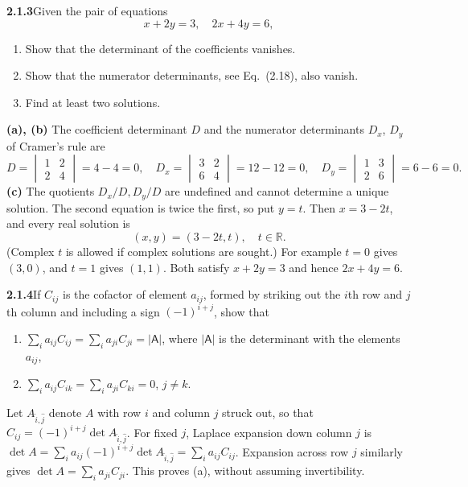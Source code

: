 \par\bigskip
\noindent\textbf{2.1.3}\quad Given the pair of equations
\[
x+2y=3,\quad 2x+4y=6,
\]
\begin{enumerate}
\item[(a)] Show that the determinant of the coefficients vanishes.
\item[(b)] Show that the numerator determinants, see Eq.~(2.18), also vanish.
\item[(c)] Find at least two solutions.
\end{enumerate}
\solution
\textbf{(a), (b)} The coefficient determinant $D$ and the numerator
determinants $D_x$, $D_y$ of Cramer's rule are
\[
D=\begin{vmatrix}1&2\\2&4\end{vmatrix}=4-4=0,\quad
D_x=\begin{vmatrix}3&2\\6&4\end{vmatrix}=12-12=0,\quad
D_y=\begin{vmatrix}1&3\\2&6\end{vmatrix}=6-6=0.
\]
\textbf{(c)} The quotients $D_x/D,D_y/D$ are undefined and cannot
determine a unique solution. The second equation is twice the first,
so put $y=t$. Then $x=3-2t$, and every real solution is
\[
\boxed{(x,y)=(3-2t,t),\quad t\in\mathbb R}.
\]
(Complex $t$ is allowed if complex solutions are sought.)
For example $t=0$ gives $(3,0)$, and $t=1$ gives $(1,1)$.
Both satisfy $x+2y=3$ and hence $2x+4y=6$.

\par\bigskip
\noindent\textbf{2.1.4}\quad If $C_{ij}$ is the cofactor of element $a_{ij}$,
formed by striking out the $i$th row and $j$th column and including a sign
$(-1)^{i+j}$, show that
\begin{enumerate}
\item[(a)] $\displaystyle\sum_{i}a_{ij}C_{ij}=\sum_{i}a_{ji}C_{ji}=|\mathsf{A}|$,
  where $|\mathsf{A}|$ is the determinant with the elements $a_{ij}$,
\item[(b)] $\displaystyle\sum_{i}a_{ij}C_{ik}=\sum_{i}a_{ji}C_{ki}=0$,
  $j\neq k$.
\end{enumerate}
\solution
Let $A_{\widehat i,\widehat j}$ denote $A$ with row $i$ and column $j$
struck out, so that $C_{ij}=(-1)^{i+j}\det A_{\widehat i,\widehat j}$.
For fixed $j$, Laplace expansion down column $j$ is
$\det A=\sum_i a_{ij}(-1)^{i+j}\det A_{\widehat i,\widehat j}
=\sum_i a_{ij}C_{ij}$.
Expansion across row $j$ similarly gives
$\det A=\sum_i a_{ji}C_{ji}$. This proves (a), without assuming
invertibility.

